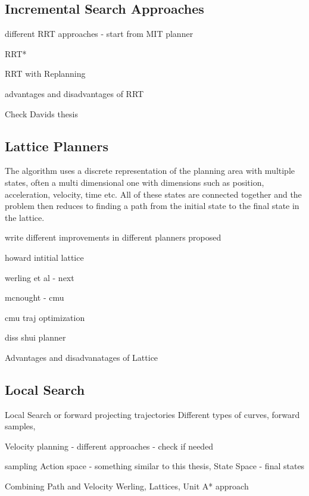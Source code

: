 \subsection{Incremental Search Approaches}
\label{rw_incremental_search}

different RRT approaches - start from MIT planner

RRT*

RRT with Replanning

advantages and disadvantages of RRT

Check Davids thesis

\subsection{Lattice Planners}
\label{rw_lattice_planners}
The algorithm uses a discrete representation of the planning area with multiple states, often a multi dimensional one with dimensions such as position, acceleration, velocity, time etc. All of these states are connected together and the problem then reduces to finding a path from the initial state to the final state in the lattice. 

write different improvements in different planners proposed

howard intitial lattice 

werling et al - next

mcnought - cmu 

cmu traj optimization

diss shui planner 

Advantages and disadvanatages of Lattice 

\subsection{Local Search}
\label{rw_local_search}

Local Search or forward projecting trajectories
Different types of curves, 
forward samples, 

Velocity planning - different approaches - check if needed

sampling
Action space - something similar to this thesis, 
State Space - final states

Combining Path and Velocity Werling, Lattices, Unit A* approach





